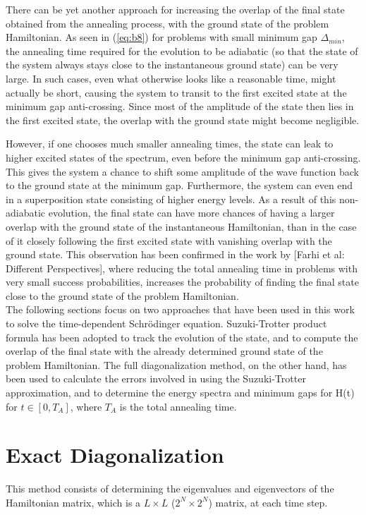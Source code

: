 \documentclass[12]{article}
\begin{document}
There can be yet another approach for increasing the overlap of the final state obtained from the annealing process, with the ground state of the problem Hamiltonian. As seen in (\ref{eq:b8}) for problems with small minimum gap $\Delta_{min}$, the annealing time required for the evolution to be adiabatic (so that the state of the system always stays close to the instantaneous ground state) can be very large. In such cases, even what otherwise looks like a reasonable time, might actually be short, causing the system to transit to the first excited state at the minimum gap anti-crossing. Since most of the amplitude of the state then lies in the first excited state, the overlap with the ground state might become negligible. 

However, if one chooses much smaller annealing times, the state can leak to higher excited states of the spectrum, even before the minimum gap anti-crossing. This gives the system a chance to shift some amplitude of the wave function back to the ground state at the minimum gap. Furthermore, the system can even end in a superposition state consisting of higher energy levels. As a result of this non-adiabatic evolution, the final state can have more chances of having a larger overlap with the ground state of the instantaneous Hamiltonian, than in the case of it closely following the first excited state with vanishing overlap with the ground state. This observation has been confirmed in the work by [Farhi et al: Different Perspectives], where reducing the total annealing time in problems with very small success probabilities, increases the probability of finding the final state close to the ground state of the problem Hamiltonian.\\

The following sections focus on two approaches that have been used in this work to solve the time-dependent Schr{\"o}dinger equation. Suzuki-Trotter product formula has been adopted to track the evolution of the state, and to compute the overlap of the final state with the already determined ground state of the problem Hamiltonian. The full diagonalization method, on the other hand, has been used to calculate the errors involved in using the Suzuki-Trotter approximation, and to determine the energy spectra and minimum gaps for H(t) for $t \in [0,T_A]$, where $T_A$ is the total annealing time.

\section{Exact Diagonalization}
This method consists of determining the eigenvalues and eigenvectors of the Hamiltonian matrix, which is a $L\times L$ ($2^N \times 2^N$) matrix, at each time step.
\end{document}
